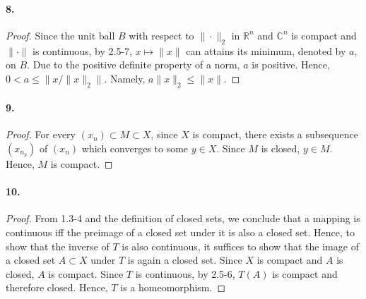   \paragraph{8.}
  \begin{proof}
    Since the unit ball $B$ with respect to $\|\cdot\|_2$ in $\mathbb{R}^n$ and
    $\mathbb{C}^n$ is compact and $\|\cdot\|$ is continuous, by 2.5-7, $x\mapsto
    \|x\|$ can attains its minimum, denoted by $a$, on $B$. Due to the positive 
    definite property of a norm, $a$ is positive. Hence, $0<a\le \|x/\|x\|_2\|$.
    Namely, $a\|x\|_2\le\|x\|$.
  \end{proof}

  \paragraph{9.}
  \begin{proof}
    For every $(x_n)\subset M\subset X$, since $X$ is compact, there exists a 
    subsequence $(x_{n_k})$ of $(x_n)$ which converges to some $y\in X$. Since 
    $M$ is closed, $y\in M$. Hence, $M$ is compact.
  \end{proof}

  \paragraph{10.}
  \begin{proof}
    From 1.3-4 and the definition of closed sets, we conclude that a mapping is
    continuous iff the preimage of a closed set under it is also a closed set.
    Hence, to show that the inverse of $T$ is also continuous, it suffices to
    show that the image of a closed set $A\subset X$ under $T$ is again a closed
    set. Since $X$ is compact and $A$ is closed, $A$ is compact. Since $T$ is 
    continuous, by 2.5-6, $T(A)$ is compact and therefore closed. Hence, $T$ is
    a homeomorphism.
  \end{proof}
